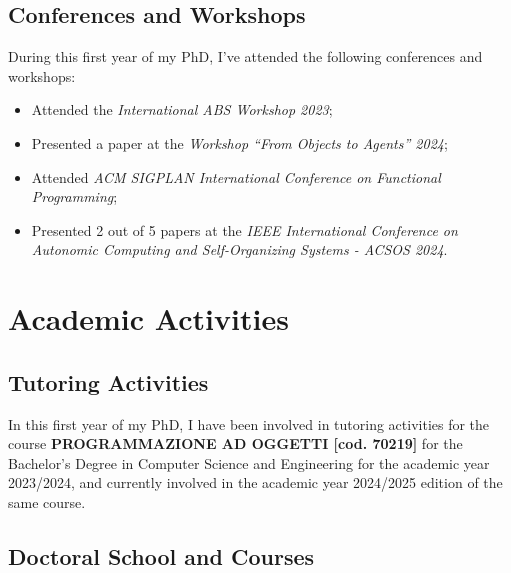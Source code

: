 \documentclass[runningheads]{llncs}
\begin{document}
\subsection{Conferences and Workshops}

During this first year of my PhD,
I've attended the following conferences and workshops:

\begin{itemize}
    \item Attended the \emph{International ABS Workshop 2023};
    \item Presented a paper at the \emph{Workshop ``From Objects to Agents'' 2024};
    \item Attended \emph{ACM SIGPLAN International Conference on Functional Programming};
    \item Presented 2 out of 5 papers at the \emph{IEEE International Conference on Autonomic Computing and Self-Organizing Systems - ACSOS 2024}.
\end{itemize}



\section{Academic Activities}

\subsection{Tutoring Activities}

In this first year of my PhD,
I have been involved in tutoring activities for the course \textbf{PROGRAMMAZIONE AD OGGETTI [cod. 70219]} for the Bachelor's Degree in Computer Science and Engineering for the academic year 2023/2024,
and currently involved in the academic year 2024/2025 edition of the same course.

\subsection{Doctoral School and Courses}
\end{document}
